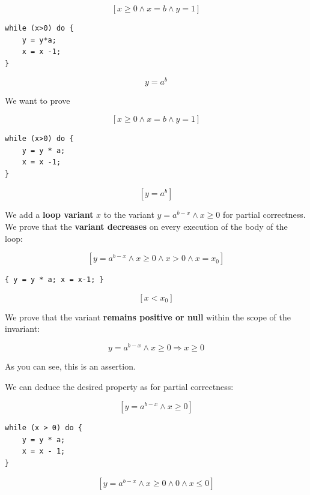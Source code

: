 \documentclass[12pt, a4paper]{book}
\begin{document}
    \begin{center}
    $$[ x \ge 0 \land x =b \land y=1]$$
    \begin{minipage}{0.3\linewidth}
\begin{lstlisting}
while (x>0) do {
    y = y*a;
    x = x -1;
}
\end{lstlisting}
    \end{minipage}
    $$y = {a}^{b}$$
    \end{center}

    \bigskip

    We want to prove
    \begin{center}
    $$[x \ge 0 \land x =b \land y =1]$$
    \begin{minipage}{0.3\linewidth}
\begin{lstlisting}
while (x>0) do {
    y = y * a;
    x = x -1;
}
\end{lstlisting}
    \end{minipage}
    $$[y = {a}^{b}]$$
    \end{center}

    \bigskip

    We add a \textbf{loop variant} $x$ to the variant $y = {a}^{b-x} \land x \ge 0$
    for partial correctness. We prove that the \textbf{variant decreases} on
    every execution of the body of the loop: \newline

    \begin{center}
    $$[y = {a}^{b-x} \land x \ge 0 \land x > 0 \land x = {x}_{0}]$$
    \begin{minipage}{0.5\linewidth}
\begin{lstlisting}
{ y = y * a; x = x-1; }
\end{lstlisting}
    \end{minipage}
    $$[x < {x}_{0}]$$
    \end{center}

    \bigskip

    We prove that the variant \textbf{remains positive or null} within the
    scope of the invariant:

    $$
    y = {a}^{b-x} \land x \ge 0 \Rightarrow x \ge 0
    $$

    As you can see, this is an assertion.

    We can deduce the desired property as for partial correctness:

    \begin{center}
    $$[y = {a}^{b-x} \land x \ge 0]$$
    \begin{minipage}{0.3\linewidth}
\begin{lstlisting}
while (x > 0) do {
    y = y * a;
    x = x - 1;
}
\end{lstlisting}
    \end{minipage}
    $$[y = {a}^{b-x} \land x \ge 0 \land 0 \land x \le 0]$$
    \end{center}
\end{document}
